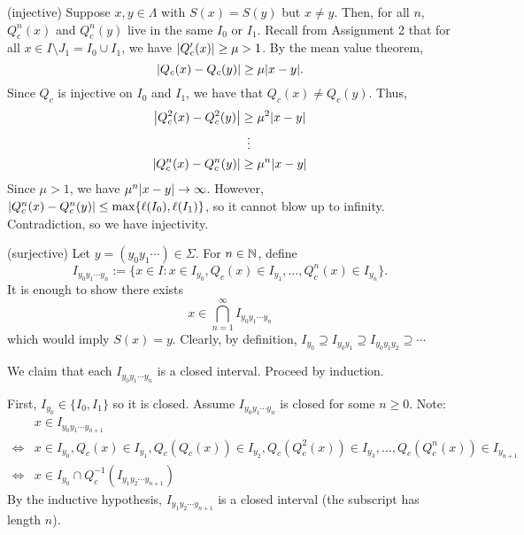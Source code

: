 \documentclass[class=pmath370,tikz,notes]{agony}
\begin{document}
\begin{prf}
  (injective) Suppose $x,y \in \Lambda$ with $S(x) = S(y)$ but $x \neq y$.
  Then, for all $n$, $Q_c^n(x)$ and $Q_c^n(y)$ live in the same $I_0$ or $I_1$.
  Recall from Assignment 2 that for all $x \in I \setminus J_1 = I_0 \cup I_1$,
  we have $\abs{Q_c'(x)} \geq \mu > 1$.
  By the mean value theorem,
  \[ \abs{Q_c(x) - Q_c(y)} \geq \mu\abs{x-y}. \]
  Since $Q_c$ is injective on $I_0$ and $I_1$,
  we have that $Q_c(x) \neq Q_c(y)$. Thus,
  \begin{align*}
    \abs{Q^2_c(x) - Q_c^2(y)} & \geq \mu^2\abs{x-y} \\
                              & \vdotswithin{\geq}  \\
    \abs{Q^n_c(x) - Q_c^n(y)} & \geq \mu^n\abs{x-y}
  \end{align*}
  Since $\mu > 1$, we have $\mu^n\abs{x-y} \to \infty$.
  However, $\abs{Q_c^n(x) - Q_c^n(y)} \leq \max\{\ell(I_0),\ell(I_1)\}$,
  so it cannot blow up to infinity.
  Contradiction, so we have injectivity.

  (surjective) Let $y = (y_0y_1\cdots) \in \Sigma$.
  For $n \in \mathbb{N}$, define
  \[ I_{y_0y_1\cdots y_n} := \{x \in I : x \in I_{y_0}, Q_c(x) \in I_{y_1}, \dotsc, Q_c^n(x) \in I_{y_n}\}. \]
  It is enough to show there exists
  \[ x \in \bigcap_{n=1}^\infty I_{y_0y_1\cdots y_n} \]
  which would imply $S(x) = y$.
  Clearly, by definition, $I_{y_0} \supseteq I_{y_0y_1} \supseteq I_{y_0y_1y_2} \supseteq \dotsb$

  We claim that each $I_{y_0y_1\cdots y_n}$ is a closed interval.
  Proceed by induction.

  First, $I_{y_0} \in \{I_0,I_1\}$ so it is closed.
  Assume $I_{y_0y_1\cdots y_n}$ is closed for some $n \geq 0$.
  Note:
  \begin{align*}
         & x \in I_{y_0y_1\cdots y_{n+1}}                                                                                             \\
    \iff & x \in I_{y_0}, Q_c(x) \in I_{y_1}, Q_c(Q_c(x)) \in I_{y_2}, Q_c(Q_c^2(x)) \in I_{y_3},\dotsc,Q_c(Q_c^n(x)) \in I_{y_{n+1}} \\
    \iff & x \in I_{y_0} \cap Q_c^{-1}(I_{y_1y_2\cdots y_{n+1}}) \tag{$\star$}
  \end{align*}
  By the inductive hypothesis, $I_{y_1y_2\cdots y_{n+1}}$ is a closed interval (the subscript has length $n$).


\end{prf}
\end{document}

